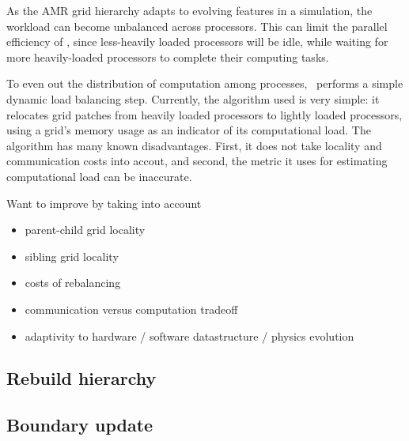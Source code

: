 \documentclass{article}
\begin{document}

As the AMR grid hierarchy adapts to evolving features in a simulation,
the workload can become unbalanced across processors.  This can limit
the parallel efficiency of \enzo, since less-heavily loaded processors
will be idle, while waiting for more heavily-loaded processors to
complete their computing tasks.

%
To even out the distribution of computation among processes, \enzo\
performs a simple dynamic load balancing step.  Currently, the
algorithm used is very simple: it relocates grid patches from heavily
loaded processors to lightly loaded processors, using a grid's memory
usage as an indicator of its computational load.  The algorithm has
many known disadvantages.  First, it does not take locality and
communication costs into accout, and second, the metric it uses for
estimating computational load can be inaccurate.

Want to improve by taking into account
\begin{itemize}
\item parent-child grid locality
\item sibling grid locality
\item costs of rebalancing 
\item communication versus computation tradeoff
\item adaptivity to hardware / software datastructure / physics evolution
\end{itemize}

\subsection{Rebuild hierarchy} \label{issue:amr-rebuild}




\subsection{Boundary update} \label{issue:amr-ghost-update}
\end{document}
